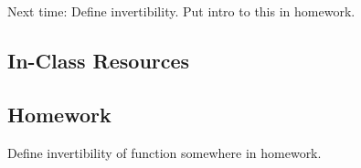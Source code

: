 \documentclass[11pt]{article}
\newcommand{\handout}{\subsubsection}
\newcommand\header[1]{\vspace*{4pt}\par {\large {\bf #1}}\par}
\newenvironment{bignote}[1][Instructor note]%
	{\begin{mdframed}\raggedright{\bf #1.~}}
	{\end{mdframed}}
\renewcommand\emph[1]{\underline{\bf{#1}}} %
\theoremstyle{definition}
\newtheorem{definition}[theorem]{Definition}
\begin{document}
Next time: Define invertibility. Put intro to this in homework.  
%
%
%
%
%
%
%
%
%
\newpage \subsection{In-Class Resources}  


\newpage \subsection{Homework}
Define invertibility of function somewhere in homework.
\end{document}
